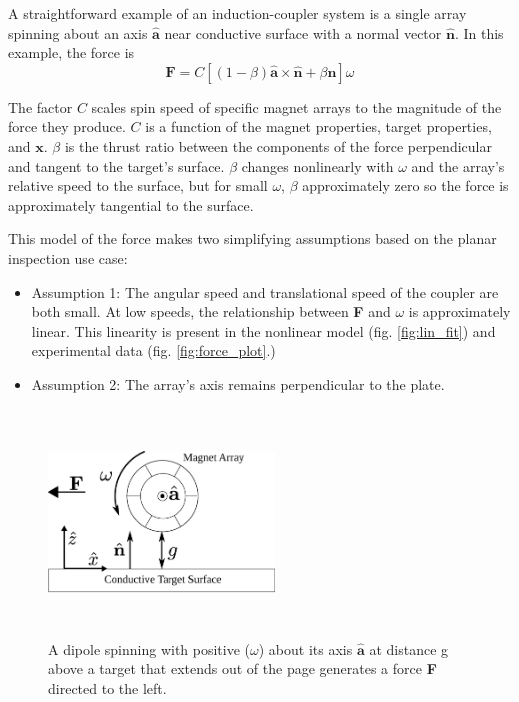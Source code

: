 A straightforward example of an induction-coupler system is a single array spinning about an axis $\hat{\boldsymbol{a}}$ near conductive surface with a normal vector $\hat{\boldsymbol{n}}$. In this example, the force is 
\begin{equation}\label{eq:singlemagforce}
\textbf{F} = C\left[  \left(1-\beta \right )\hat{\boldsymbol{a}}{\times}\hat{\boldsymbol{n}} + \beta\hat{\boldsymbol{n}} \right ] \omega
\end{equation}

The factor $C$ scales spin speed of specific magnet arrays to the magnitude of the force they produce. $C$ is a function of the magnet properties, target properties, and $\boldsymbol{x}$. $\beta$ is the thrust ratio between the components of the force perpendicular and tangent to the target's surface. $\beta$ changes nonlinearly with $\omega$ and the array's relative speed to the surface, but for small $\omega$, $\beta$ approximately zero so the force is approximately tangential to the surface. 

This model of the force makes two simplifying assumptions based on the planar inspection use case:
\begin{itemize}
\item{Assumption 1:} The angular speed and translational speed of the coupler are both small. At low speeds, the relationship between \textbf{F} and $\omega$ is approximately linear. This linearity is present in the nonlinear model (fig. \ref{fig:lin_fit}) and experimental data (fig. \ref{fig:force_plot}.)
\item{Assumption 2:} The array's axis remains perpendicular to the plate.  

\end{itemize}


\begin{figure}
\includegraphics[width = 6cm, height = 6cm ]{figures/spin_mag_diagram.eps}

\caption{A dipole spinning with positive ($\omega$) about its axis $\hat{\textbf{a}}$ at distance g above a target that extends out of the page generates a force \textbf{F} directed to the left.}
\label{fig:arry_force_diagram}
\end{figure}

